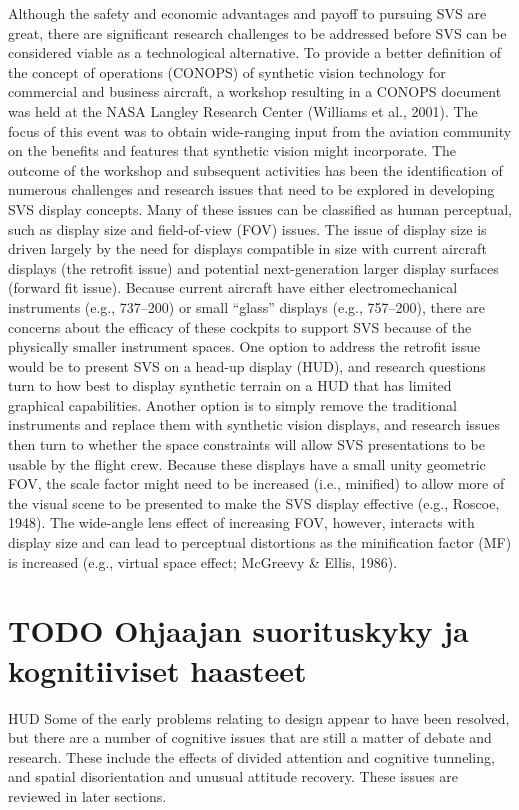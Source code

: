 \documentclass[utf8,bachelor,manualbib]{gradu3}
\begin{document}
Although the safety and economic advantages and payoff to pursuing SVS are
great, there are significant research challenges to be addressed before SVS can be
considered viable as a technological alternative. To provide a better definition of
the concept of operations (CONOPS) of synthetic vision technology for commercial
and business aircraft, a workshop resulting in a CONOPS document was held
at the NASA Langley Research Center (Williams et al., 2001). The focus of this
event was to obtain wide-ranging input from the aviation community on the benefits
and features that synthetic vision might incorporate. The outcome of the workshop
and subsequent activities has been the identification of numerous challenges
and research issues that need to be explored in developing SVS display concepts.
Many of these issues can be classified as human perceptual, such as display size
and field-of-view (FOV) issues.
The issue of display size is driven largely by the need for displays compatible in
size with current aircraft displays (the retrofit issue) and potential next-generation
larger display surfaces (forward fit issue). Because current aircraft have either
electromechanical instruments (e.g., 737–200) or small “glass” displays (e.g.,
757–200), there are concerns about the efficacy of these cockpits to support SVS
because of the physically smaller instrument spaces. One option to address the retrofit
issue would be to present SVS on a head-up display (HUD), and research
questions turn to how best to display synthetic terrain on a HUD that has limited
graphical capabilities. Another option is to simply remove the traditional instruments
and replace them with synthetic vision displays, and research issues then
turn to whether the space constraints will allow SVS presentations to be usable by the flight crew. Because these displays have a small unity geometric FOV, the scale
factor might need to be increased (i.e., minified) to allow more of the visual scene
to be presented to make the SVS display effective (e.g., Roscoe, 1948). The
wide-angle lens effect of increasing FOV, however, interacts with display size and
can lead to perceptual distortions as the minification factor (MF) is increased (e.g.,
virtual space effect; McGreevy \& Ellis, 1986). \citep{prinzel2004}

\section{TODO Ohjaajan suorituskyky ja kognitiiviset haasteet}

HUD
Some of the
early problems relating to design appear to have been resolved, but there are a
number of cognitive issues that are still a matter of debate and research. These include
the effects of divided attention and cognitive tunneling, and spatial disorientation
and unusual attitude recovery. These issues are reviewed in later sections. \citep{crawfordneal2006}
\end{document}
